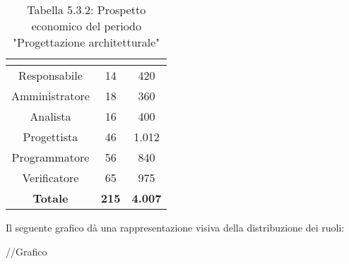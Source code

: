 \renewcommand{\arraystretch}{1.5}
\begin{table}[H]
\begin{center}
\begin{tabular}{|c|c|c|}
\hline
\rowcolor{title_row}
\textbf{\color{title_text}{Ruolo}}  & \textbf{\color{title_text}{Ore}} & \textbf{\color{title_text}{Costo in \euro}} \\ \hline
Responsabile    & 14              & 420                     \\ \hline
Amministratore  & 18              & 360                   \\ \hline
Analista        & 16              & 400                    \\ \hline
Progettista     & 46              & 1.012                     \\ \hline
Programmatore   & 56              & 840                     \\ \hline
Verificatore    & 65              & 975                    \\ \hline
\textbf{Totale} & \textbf{215}    & \textbf{4.007}         \\ \hline
\end{tabular}
\caption{Tabella 5.3.2: Prospetto economico del periodo "Progettazione architetturale"\label{}}
\end{center}
\end{table}
\renewcommand{\arraystretch}{1}

Il seguente grafico dà una rappresentazione visiva della distribuzione dei ruoli: \\
\begin{center}
//Grafico
\end{center}

\pagebreak